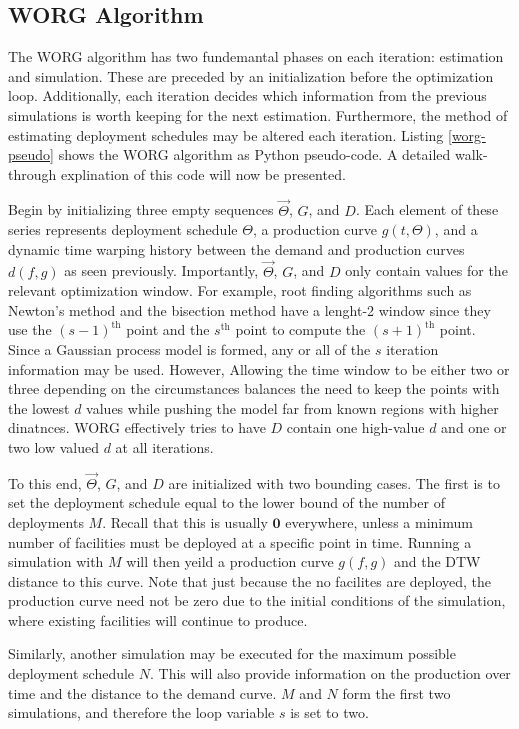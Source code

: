 \subsection{WORG Algorithm}
\label{algo}

The WORG algorithm has two fundemantal phases on each iteration:
estimation and simulation.  These are preceded by an initialization 
before the optimization loop. Additionally, each iteration decides 
which information from the previous simulations is worth keeping for the
next estimation. Furthermore, the method of estimating deployment 
schedules may be altered each iteration.  Listing \ref{worg-pseudo}
shows the WORG algorithm as Python pseudo-code. A detailed walk-through 
explination of this code will now be presented.

Begin by initializing three empty sequences $\vec{\Theta}$, $G$, and $D$.
Each element of these series represents deployment schedule $\Theta$, 
a production curve $g(t, \Theta)$, and a dynamic time warping history 
between the demand and production curves $d(f, g)$ as seen previously.
Importantly, $\vec{\Theta}$, $G$, and $D$ only contain values for
the relevant optimization window. For example, root finding algorithms
such as Newton's method and the bisection method have a lenght-2 window
since they use the $(s-1)^\mathrm{th}$ point and the $s^\mathrm{th}$ point
to compute the $(s+1)^\mathrm{th}$ point. Since a Gaussian process model is 
formed, any or all of the $s$ iteration information may be used. However, 
Allowing the time window to be either two or three depending on the 
circumstances balances the need to keep the points with the lowest $d$ 
values while pushing the model far from known regions with higher 
dinatnces. WORG effectively tries to have $D$ contain one high-value $d$
and one or two low valued $d$ at all iterations. 

To this end, $\vec{\Theta}$, $G$, and $D$ are initialized with two 
bounding cases. The first is to set the deployment schedule equal to the
lower bound of the number of deployments $M$.  Recall that this is 
usually $\mathbf{0}$ everywhere, unless a minimum number of facilities 
must be deployed at a specific point in time. Running a simulation with 
$M$ will then yeild a production curve $g(f, g)$ and the DTW distance to
this curve.  Note that just because the no facilites are deployed, the 
production curve need not be zero due to the initial conditions of the 
simulation, where existing facilities will continue to produce. 

Similarly, another simulation may be executed for the maximum possible
deployment schedule $N$. This will also provide information on the 
production over time and the distance to the demand curve. $M$ and $N$
form the first two simulations, and therefore the loop 
variable $s$ is set to two.

